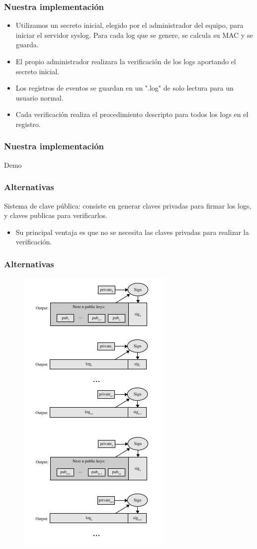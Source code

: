 \documentclass[10pt, a4paper,english,spanish]{beamer}
\begin{document}
\begin{frame}
\frametitle{Nuestra implementación}
\begin{itemize}
\item Utilizamos un secreto inicial, elegido por el administrador del equipo, para iniciar el servidor syslog.
Para cada log que se genere, se calcula su MAC y se guarda.
\item El propio administrador realizara la verificación de los logs aportando el secreto inicial.
\item Los registros de eventos se guardan en un ".log" de solo lectura para un usuario normal.
\item Cada verificación realiza el procedimiento descripto para todos los logs en el registro.
\end{itemize}
\end{frame}

\begin{frame}
\frametitle{Nuestra implementación}
Demo
\end{frame}

\begin{frame}
\frametitle{Alternativas}
Sistema de clave pública: consiste en generar claves privadas para firmar los logs, y claves publicas para verificarlos.
\begin{itemize}
\item Su principal ventaja es que no se necesita las claves privadas para realizar la verificación.
\end{itemize}
\end{frame}

\begin{frame}
\frametitle{Alternativas}
  \begin{figure}
    \includegraphics[scale=0.4]{imagenes/PublicKey.png}
  \end{figure}
\end{frame}
\end{document}
